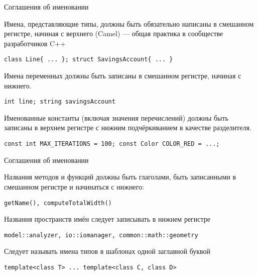 \begin{frame}[t,fragile]{Соглашения об именовании}

Имена, представляющие типы, должны быть обязательно написаны в смешанном регистре, начиная с верхнего (Camel) --- 
общая практика в сообществе разработчиков C++

         \begin{lstlisting}
class Line{ ... }; struct SavingsAccount{ ... }  
         \end{lstlisting}

Имена переменных должны быть записаны в смешанном регистре, начиная с нижнего.

         \begin{lstlisting}
int line; string savingsAccount
         \end{lstlisting}

Именованные константы (включая значения перечислений) должны быть записаны в верхнем регистре с нижним подчёркиванием в качестве разделителя.

\begin{lstlisting}
const int MAX_ITERATIONS = 100; const Color COLOR_RED = ...;
\end{lstlisting}

\end{frame}

\begin{frame}[t,fragile]{Соглашения об именовании}

Названия методов и функций должны быть глаголами, быть записанными в смешанном регистре и начинаться с нижнего: 

\begin{lstlisting}
getName(), computeTotalWidth()
\end{lstlisting}

Названия пространств имён следует записывать в нижнем регистре 

\begin{lstlisting}
model::analyzer, io::iomanager, common::math::geometry
\end{lstlisting}

Следует называть имена типов в шаблонах одной заглавной буквой 

\begin{lstlisting}
template<class T> ... template<class C, class D> 
\end{lstlisting}

\end{frame}
